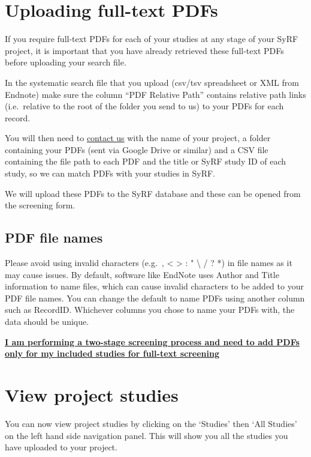 \documentclass[
]{book}
\begin{document}
\hypertarget{uploading-full-text-pdfs}{%
\section{Uploading full-text PDFs}\label{uploading-full-text-pdfs}}

If you require full-text PDFs for each of your studies at any stage of your SyRF project, it is important that you have already retrieved these full-text PDFs before uploading your search file.

In the systematic search file that you upload (csv/tsv spreadsheet or XML from Endnote) make sure the column ``PDF Relative Path'' contains relative path links (i.e.~relative to the root of the folder you send to us) to your PDFs for each record.

You will then need to \href{syrf.info@ed.ac.uk}{contact us} with the name of your project, a folder containing your PDFs (sent via Google Drive or similar) and a CSV file containing the file path to each PDF and the title or SyRF study ID of each study, so we can match PDFs with your studies in SyRF.

We will upload these PDFs to the SyRF database and these can be opened from the screening form.

\hypertarget{pdf-file-names}{%
\subsection{PDF file names}\label{pdf-file-names}}

Please avoid using invalid characters (e.g.~, \textless{} \textgreater{} : " \textbackslash{} / \textbar{} ? *) in file names as it may cause issues. By default, software like EndNote uses Author and Title information to name files, which can cause invalid characters to be added to your PDF file names. You can change the default to name PDFs using another column such as RecordID. Whichever columns you chose to name your PDFs with, the data should be unique.

\href{https://syrf.org.uk/faq}{\textbf{I am performing a two-stage screening process and need to add PDFs only for my included studies for full-text screening}}

\hypertarget{view-project-studies}{%
\section{View project studies}\label{view-project-studies}}

You can now view project studies by clicking on the `Studies' then `All Studies' on the left hand side navigation panel. This will show you all the studies you have uploaded to your project.
\end{document}
